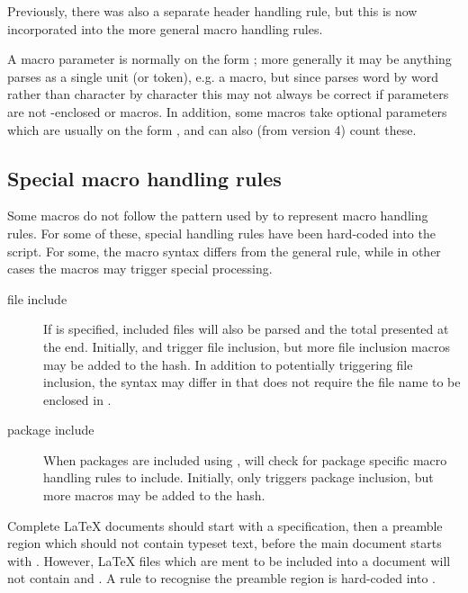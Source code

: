 \documentclass{article}
\begin{document}
Previously, there was also a separate header handling rule, but this is now incorporated into the more general macro handling rules.

A macro parameter is normally on the form ; more generally it may be anything \TeXcount{} parses as a single unit (or token), e.g. a macro, but since \TeXcount{} parses word by word rather than character by character this may not always be correct if parameters are not \code{\{\}}-enclosed or macros. In addition, some macros take optional parameters which are usually on the form , and \TeXcount{} can also (from version 4) count these.


\subsection{Special macro handling rules}

Some macros do not follow the pattern used by \TeXcount{} to represent macro handling rules. For some of these, special handling rules have been hard-coded into the \TeXcount{} script. For some, the macro syntax differs from the general rule, while in other cases the macros may trigger special processing.

\begin{description}

\item[file include]If  is specified, included files will also be parsed and the total presented at the end. Initially,  and  trigger file inclusion, but more file inclusion macros may be added to the  hash. In addition to potentially triggering file inclusion, the syntax may differ in that  does not require the file name to be enclosed in \code{\{\ldots\}}.

\item[package include]When packages are included using , \TeXcount{} will check for package specific macro handling rules to include. Initially, only  triggers package inclusion, but more macros may be added to the  hash.

\end{description}

Complete \LaTeX{} documents should start with a  specification, then a preamble region which should not contain typeset text, before the main document starts with . However, \LaTeX{} files which are ment to be included into a document will not contain  and . A rule to recognise the preamble region is hard-coded into \TeXcount{}.
\end{document}
